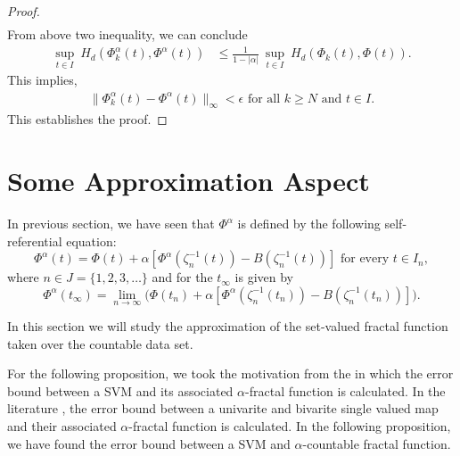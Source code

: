 \documentclass[12pt,oneside,reqno]{amsart}
\theoremstyle{definition}
\theoremstyle{remark}
\begin{document}
\begin{proof}
\begin{align*}
    \end{align*}
    From above two inequality, we can conclude
    \begin{align*}
         \underset{t\in I}{\sup}~H_d(\Phi^{\alpha}_{k}(t), \Phi^{\alpha}(t)) &\leq \frac{1}{1-\lvert \alpha \rvert}~\underset{t\in I}{\sup}~H_d(\Phi_{k}(t),\Phi(t)).
        \end{align*}
        This implies,
        \begin{align*}
            \lVert \Phi_k^{\alpha} (t)- \Phi^\alpha(t)\rVert _\infty < \epsilon \text{ for all } k\geq N \text{ and } t \in I.
        \end{align*}
This establishes the proof.


\end{proof}
\section{Some Approximation Aspect}\label{sec4}

In previous section, we have seen that $\Phi^{\alpha}$ is defined by the following self-referential equation:
 \[\Phi^{\alpha}(t)= \Phi(t) + \alpha  \left[\Phi^{\alpha}\left(\zeta_n^{-1}(t)\right) - B\left(\zeta_n^{-1}(t)\right)\right] \text{ for every }  t \in I_n,\]
where $n \in J =\{1,2,3,\ldots\}$ and for the $t_\infty$ is given by
 \[  \Phi^{\alpha}(t_\infty)=\underset{n \rightarrow \infty}{\lim}\Big( \Phi(t_n) + \alpha [\Phi^{\alpha}(\zeta_n^{-1}(t_n)) - B(\zeta_n^{-1}(t_n))]\Big).\]


In this section we will study the approximation of the set-valued fractal function taken over the countable data set.
 
For the following proposition, we took the motivation from the \cite[Proposition $1$]{Ver21} in which the error bound between a SVM and its associated $\alpha$-fractal function is calculated. In the literature \cite{Navascues04,sverma2020}, the error bound between a univarite and bivarite single valued map and their associated $\alpha$-fractal function is calculated. In the following proposition, we have found the error bound between a SVM and $\alpha$-countable fractal function.
\end{document}
